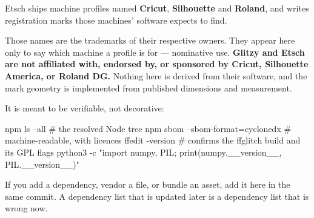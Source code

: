 \documentclass[fontpath=fonts/,logopath=logo/]{riposte-doc}
\begin{document}

Etsch ships machine profiles named \textbf{Cricut}, \textbf{Silhouette} and \textbf{Roland}, and writes registration marks those machines' software expects to find.

Those names are the trademarks of their respective owners. They appear here only to say which machine a profile is for — nominative use. \textbf{Glitzy and Etsch are not affiliated with, endorsed by, or sponsored by Cricut, Silhouette America, or Roland DG.} Nothing here is derived from their software, and the mark geometry is implemented from published dimensions and measurement.



It is meant to be verifiable, not decorative:

\ripcodeopen
{}
\begin{ripcodeblock}
npm ls --all                         # the resolved Node tree
npm sbom --sbom-format=cyclonedx     # machine-readable, with licences
ffedit -version                      # confirms the ffglitch build and its GPL flags
python3 -c "import numpy, PIL; print(numpy.__version__, PIL.__version__)"
\end{ripcodeblock}
\ripcodesizereset\ripcodeclose

If you add a dependency, vendor a file, or bundle an asset, add it here in the same commit. A dependency list that is updated later is a dependency list that is wrong now.

\ripend
\end{document}
